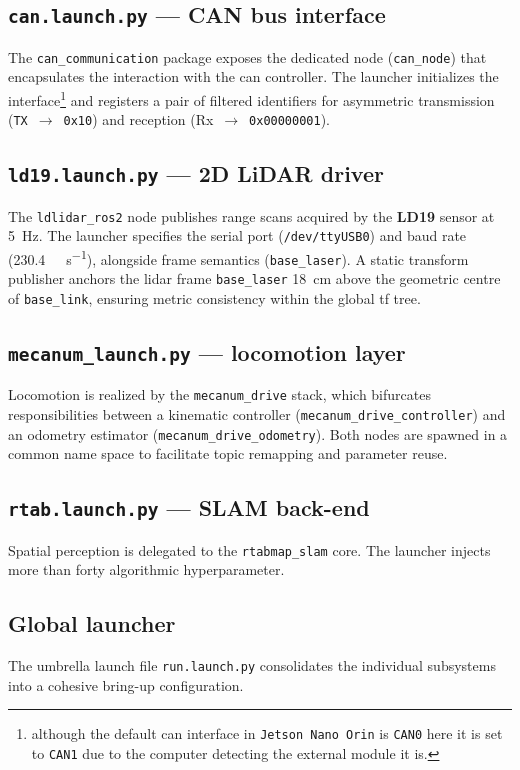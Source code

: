 \subsection*{\texttt{can.launch.py} --- CAN bus interface}
The \texttt{can\_communication} package exposes the dedicated node (\texttt{can\_node}) that encapsulates the interaction with the \gls{can} controller. The launcher initializes the interface\footnote{although the default can interface in \texttt{Jetson Nano Orin} is \texttt{CAN0} here it is set to \texttt{CAN1} due to the computer detecting the external module it is.} and registers a pair of filtered identifiers for asymmetric transmission (\texttt{TX}~$\rightarrow$~\texttt{0x10}) and reception (Rx~$\rightarrow$~\texttt{0x00000001}).

\subsection*{\texttt{ld19.launch.py} --- 2D LiDAR driver}
The \texttt{ldlidar\_ros2} node publishes range scans acquired by the \textbf{LD19} sensor at \SI{5}{\hertz}. The launcher specifies the serial port (\texttt{/dev/ttyUSB0}) and baud rate (\SI{230.4}{\kilo\bit\per\second}), alongside frame semantics (\texttt{base\_laser}). A static transform publisher anchors the \gls{lidar} frame \texttt{base\_laser} \SI{18}{\centi\metre} above the geometric centre of \texttt{base\_link}, ensuring metric consistency within the global \gls{tf} tree.

\subsection*{\texttt{mecanum\_launch.py} --- locomotion layer}
Locomotion is realized by the \texttt{mecanum\_drive} stack, which bifurcates responsibilities between a kinematic controller (\texttt{mecanum\_drive\_controller}) and an odometry estimator (\texttt{mecanum\_drive\_odometry}). Both nodes are spawned in a common name space to facilitate topic remapping and parameter reuse.

\subsection*{\texttt{rtab.launch.py} --- SLAM back-end}
Spatial perception is delegated to the \texttt{rtabmap\_slam} core. The launcher injects more than forty algorithmic hyperparameter.

\subsection*{Global launcher}
The umbrella launch file \texttt{run.launch.py} consolidates the individual subsystems into a cohesive bring-up configuration.

